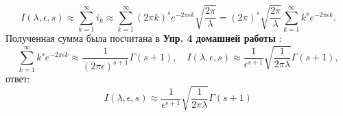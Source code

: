\begin{equation*}
I(\lambda,\epsilon,s) \approx \sum_{k=1}^{\infty} i_k \approx \sum_{k=1}^{\infty} (2 \pi k)^se^{-2 \pi \epsilon k}\sqrt{\frac{2 \pi}{\lambda}} = (2 \pi)^s\sqrt{\frac{2 \pi}{\lambda}} \sum_{k=1}^{\infty} k^se^{-2 \pi \epsilon k}.
\end{equation*}
Полученная сумма была посчитана в \textbf{Упр. 4 домашней работы }:
\begin{equation*}
  \sum_{k=1}^{\infty} k^se^{-2 \pi \epsilon k} \approx \frac{1}{(2 \pi \epsilon)^{s+1}}\Gamma(s + 1),\quad I(\lambda,\epsilon,s) \approx \frac{1}{\epsilon^{s+1}}\sqrt{\frac{1}{2 \pi\lambda}}\Gamma(s+1),
\end{equation*}
ответ:
\begin{equation*}
\boxed{I(\lambda,\epsilon,s) \approx \frac{1}{\epsilon^{s+1}}\sqrt{\frac{1}{2 \pi\lambda}}\Gamma(s+1)}
\end{equation*}